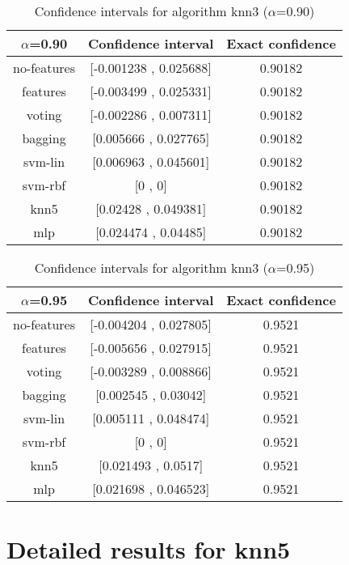 \documentclass[a4paper,10pt]{article}
\begin{document}
\begin{table}[!htp]
\centering\small
\begin{tabular}{
|c|c|c|}
\hline
 $\alpha$=0.90 & Confidence interval & Exact confidence \\ \hline 
no-features & [-0.001238 , 0.025688] & 0.90182\\ \hline 
features & [-0.003499 , 0.025331] & 0.90182\\ \hline 
voting & [-0.002286 , 0.007311] & 0.90182\\ \hline 
bagging & [0.005666 , 0.027765] & 0.90182\\ \hline 
svm-lin & [0.006963 , 0.045601] & 0.90182\\ \hline 
svm-rbf & [0 , 0] & 0.90182\\ \hline 
knn5 & [0.02428 , 0.049381] & 0.90182\\ \hline 
mlp & [0.024474 , 0.04485] & 0.90182\\ \hline 

\end{tabular}
\caption{Confidence intervals for algorithm knn3 ($\alpha$=0.90)}
\end{table}
\begin{table}[!htp]
\centering\small
\begin{tabular}{
|c|c|c|}
\hline
 $\alpha$=0.95 & Confidence interval & Exact confidence \\ \hline 
no-features & [-0.004204 , 0.027805] & 0.9521\\ \hline 
features & [-0.005656 , 0.027915] & 0.9521\\ \hline 
voting & [-0.003289 , 0.008866] & 0.9521\\ \hline 
bagging & [0.002545 , 0.03042] & 0.9521\\ \hline 
svm-lin & [0.005111 , 0.048474] & 0.9521\\ \hline 
svm-rbf & [0 , 0] & 0.9521\\ \hline 
knn5 & [0.021493 , 0.0517] & 0.9521\\ \hline 
mlp & [0.021698 , 0.046523] & 0.9521\\ \hline 

\end{tabular}
\caption{Confidence intervals for algorithm knn3 ($\alpha$=0.95)}
\end{table}

 \clearpage 


\section{Detailed results for knn5}
\end{document}
